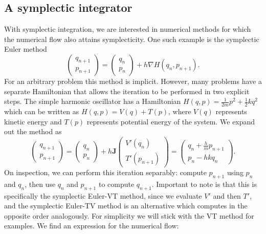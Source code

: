 \documentclass{report}
\theoremstyle{exampstyle} \newtheorem{example}[theorem]{Example}
\theoremstyle{exampstyle} \newtheorem{remark}[theorem]{Remark}
\theoremstyle{exampstyle} \newtheorem{definition}[theorem]{Definition}
\theoremstyle{exampstyle} \newtheorem{lemma}[theorem]{Lemma}
\begin{document}
\subsection{A symplectic integrator}
With symplectic integration, we are interested in numerical methods for which the numerical flow also attains symplecticity.
One such example is the symplectic Euler method
\begin{equation*}
	\begin{pmatrix}
		q_{n+1} \\
		p_{n+1} 
	\end{pmatrix} = \begin{pmatrix}
		q_{n} \\
		p_{n}
	\end{pmatrix} + h \nabla H(q_{n}, p_{n+1}).
\end{equation*}
For an arbitrary problem this method is implicit. However, many problems have a separate Hamiltonian that allows the iteration to be performed in two explicit steps. 
The simple harmonic oscillator has a Hamiltonian $H(q, p) = \frac{1}{2m}p^2 + \frac{1}{2}kq^2$ which can be written as $H(q, p) = V(q) + T(p)$, where $V(q)$ represents kinetic energy and $T(p)$ represents potential energy of the system.
We expand out the method as
\begin{equation*}
	\begin{pmatrix}
		q_{n+1} \\
		p_{n+1} 
	\end{pmatrix} = \begin{pmatrix}
		q_{n} \\
		p_{n}
	\end{pmatrix} + h \mathbf{J} \begin{pmatrix}
		V'(q_n) \\
		T'(p_{n+1})
	\end{pmatrix} = \begin{pmatrix}
		q_{n} + \frac{h}{m}p_{n+1} \\
		p_{n} - hk q_n
	\end{pmatrix}.
\end{equation*}
On inspection, we can perform this iteration separably: compute $p_{n+1}$ using $p_n$ and $q_n$,
then use $q_n$ and $p_{n+1}$ to compute $q_{n+1}$.
Important to note is that this is specifically the symplectic Euler-VT method, since we evaluate $V'$ and then $T'$,
and the symplectic Euler-TV method is an alternative which computes in the opposite order analogously.
For simplicity we will stick with the VT method for examples.
We find an expression for the numerical flow:
\end{document}
